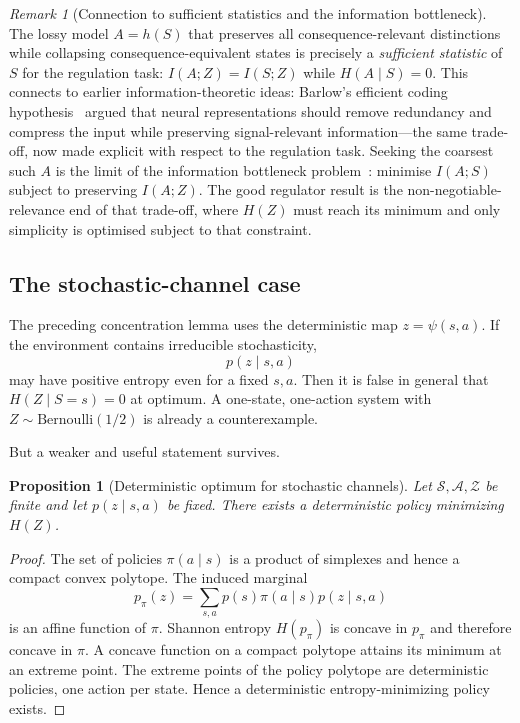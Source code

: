 \documentclass[11pt]{article}
\newtheorem{proposition}{Proposition}
\theoremstyle{remark}
\newtheorem{remark}{Remark}
\newcommand{\Acal}{\mathcal A}
\newcommand{\Scal}{\mathcal S}
\newcommand{\Zcal}{\mathcal Z}
\newcommand{\1}{\mathbb 1}
\begin{document}
\begin{remark}[Connection to sufficient statistics and the information bottleneck]
The lossy model $A=h(S)$ that preserves all consequence-relevant distinctions while collapsing consequence-equivalent states is precisely a \emph{sufficient statistic} of $S$ for the regulation task: $I(A;Z)=I(S;Z)$ while $H(A\mid S)=0$. This connects to earlier information-theoretic ideas: Barlow's efficient coding hypothesis~\citep{Barlow-possible61} argued that neural representations should remove redundancy and compress the input while preserving signal-relevant information---the same trade-off, now made explicit with respect to the regulation task. Seeking the coarsest such $A$ is the limit of the information bottleneck problem~\citep{Tishby-information99}: minimise $I(A;S)$ subject to preserving $I(A;Z)$. The good regulator result is the non-negotiable-relevance end of that trade-off, where $H(Z)$ must reach its minimum and only simplicity is optimised subject to that constraint.
\end{remark}

\subsection{The stochastic-channel case}

The preceding concentration lemma uses the deterministic map $z=\psi(s,a)$. If the environment contains irreducible stochasticity,
\begin{equation}
    p(z\mid s,a)
\end{equation}
may have positive entropy even for a fixed $s,a$. Then it is false in general that $H(Z\mid S=s)=0$ at optimum. A one-state, one-action system with $Z\sim \mathrm{Bernoulli}(1/2)$ is already a counterexample.

But a weaker and useful statement survives.

\begin{proposition}[Deterministic optimum for stochastic channels]
\label{prop:stochastic-deterministic}
Let $\Scal,\Acal,\Zcal$ be finite and let $p(z\mid s,a)$ be fixed. There exists a deterministic policy minimizing $H(Z)$.
\end{proposition}

\begin{proof}
The set of policies $\pi(a\mid s)$ is a product of simplexes and hence a compact convex polytope. The induced marginal
\begin{equation}
    p_\pi(z)=\sum_{s,a}p(s)\pi(a\mid s)p(z\mid s,a)
\end{equation}
is an affine function of $\pi$. Shannon entropy $H(p_\pi)$ is concave in $p_\pi$ and therefore concave in $\pi$. A concave function on a compact polytope attains its minimum at an extreme point. The extreme points of the policy polytope are deterministic policies, one action per state. Hence a deterministic entropy-minimizing policy exists.
\end{proof}
\end{document}
